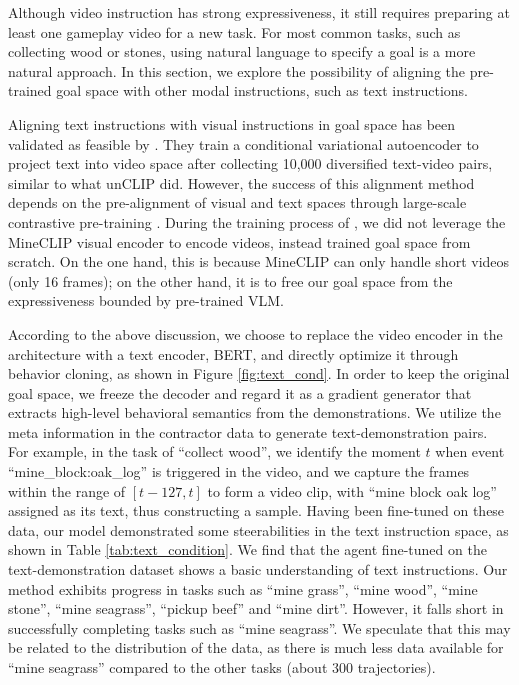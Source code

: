 \documentclass[11pt, a4paper, logo, one column]{craftjarvis}
\begin{document}
Although video instruction has strong expressiveness, it still requires preparing at least one gameplay video for a new task. For most common tasks, such as collecting wood or stones, using natural language to specify a goal is a more natural approach. In this section, we explore the possibility of aligning the pre-trained goal space with other modal instructions, such as text instructions.  

Aligning text instructions with visual instructions in goal space has been validated as feasible by \cite{steve1}. They train a conditional variational autoencoder to project text into video space after collecting 10,000 diversified text-video pairs, similar to what unCLIP did. However, the success of this alignment method depends on the pre-alignment of visual and text spaces through large-scale contrastive pre-training \citep{minedojo}. 
During the training process of \agent, we did not leverage the MineCLIP visual encoder to encode videos, instead trained goal space from scratch. On the one hand, this is because MineCLIP can only handle short videos (only 16 frames); on the other hand, it is to free our goal space from the expressiveness bounded by pre-trained VLM. 

According to the above discussion, we choose to replace the video encoder in the \agent architecture with a text encoder, BERT, and directly optimize it through behavior cloning, as shown in Figure \ref{fig:text_cond}. In order to keep the original goal space, we freeze the decoder and regard it as a gradient generator that extracts high-level behavioral semantics from the demonstrations. 
We utilize the meta information in the contractor data to generate text-demonstration pairs. For example, in the task of ``collect wood'', we identify the moment $t$ when event ``mine\_block:oak\_log'' is triggered in the video, and we capture the frames within the range of $[t-127, t]$ to form a video clip, with ``mine block oak log'' assigned as its text, thus constructing a sample. Having been fine-tuned on these data, our model demonstrated some steerabilities in the text instruction space, as shown in Table \ref{tab:text_condition}. 
We find that the agent fine-tuned on the text-demonstration dataset shows a basic understanding of text instructions. Our method exhibits progress in tasks such as ``mine grass'', ``mine wood'', ``mine stone'', ``mine seagrass'', ``pickup beef'' and ``mine dirt''. However, it falls short in successfully completing tasks such as ``mine seagrass''. We speculate that this may be related to the distribution of the data, as there is much less data available for ``mine seagrass'' compared to the other tasks (about 300 trajectories). 
\end{document}

